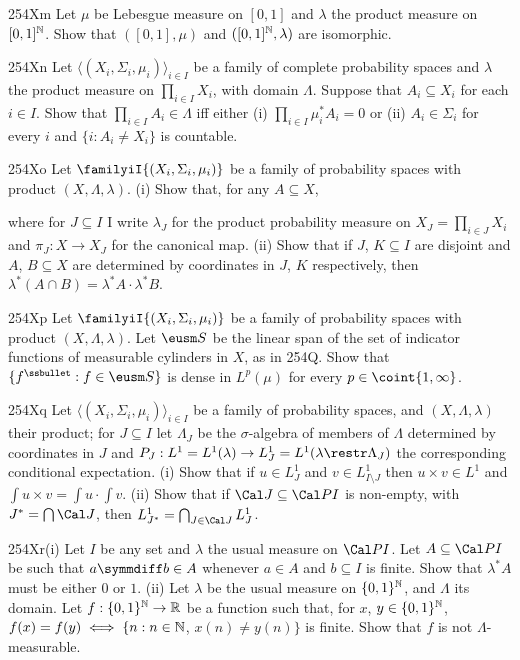 {\spheader 254Xm Let $\mu$ be Lebesgue measure on $[0,1]$ and
$\lambda$ the product measure on $[0,1]^{\Bbb N}$.   Show that
$([0,1],\mu)$ and $([0,1]^{\Bbb N},\lambda)$ are isomorphic.

\spheader 254Xn Let $\langle(X_i,\Sigma_i,\mu_i)\rangle_{i\in I}$
be a family of complete probability spaces and $\lambda$ the product
measure on $\prod_{i\in I}X_i$, with domain $\Lambda$.   Suppose that
$A_i\subseteq X_i$ for
each $i\in I$.   Show that $\prod_{i\in I}A_i\in\Lambda$ iff either (i)
$\prod_{i\in I}\mu_i^*A_i=0$ or (ii) $A_i\in\Sigma_i$ for
every $i$ and $\{i:A_i\ne X_i\}$ is countable.   

\spheader 254Xo Let $\familyiI{(X_i,\Sigma_i,\mu_i)}$ be a family of
probability spaces with product $(X,\Lambda,\lambda)$.   (i) Show that,
for any $A\subseteq X$,


\noindent where for $J\subseteq I$ I write $\lambda_J$ for the product
probability measure on $X_J=\prod_{i\in J}X_i$ and $\pi_J:X\to X_J$ for
the canonical map.   (ii) Show that if $J$, $K\subseteq I$ are disjoint
and $A$, $B\subseteq X$ are determined by coordinates in $J$, $K$
respectively, then $\lambda^*(A\cap B)=\lambda^*A\cdot\lambda^*B$.

\spheader 254Xp Let $\familyiI{(X_i,\Sigma_i,\mu_i)}$ be a family of
probability spaces with product $(X,\Lambda,\lambda)$.   Let $\eusm S$
be the linear span of the set of indicator functions of measurable
cylinders in $X$, as in 254Q.   Show that
$\{f^{\ssbullet}:f\in\eusm S\}$ is dense in $L^p(\mu)$ for every
$p\in\coint{1,\infty}$.

\spheader 254Xq Let $\langle(X_i,\Sigma_i,\mu_i)\rangle_{i\in I}$ be a
family of probability spaces, and $(X,\Lambda,\lambda)$ their product;
for $J\subseteq I$ let $\Lambda_J$ be the $\sigma$-algebra of members of
$\Lambda$ determined by coordinates in $J$ and
$P_J:L^1=L^1(\lambda)\to L^1_J=L^1(\lambda\restr\Lambda_J)$ the
corresponding conditional expectation.   (i) Show that if $u\in L^1_J$
and $v\in L^1_{I\setminus J}$ then $u\times v\in L^1$ and
$\int u\times v=\int u\cdot\int v$.
   (ii) Show that if $\Cal J\subseteq\Cal PI$ is
non-empty, with $J^*=\bigcap\Cal J$, then
$L^1_{J^*}=\bigcap_{J\in\Cal J}L^1_J$.

\spheader 254Xr(i) Let $I$ be any set and $\lambda$ the usual measure on
$\Cal PI$.   Let $A\subseteq\Cal PI$ be such that $a\symmdiff b\in A$
whenever $a\in A$ and $b\subseteq I$ is finite.   Show that $\lambda^*A$
must be either $0$ or $1$.
(ii) Let $\lambda$ be the usual measure on $\{0,1\}^{\Bbb N}$, and
$\Lambda$ its domain.   Let $f:\{0,1\}^{\Bbb N}\to\Bbb R$ be a function
such that, for $x$, $y\in\{0,1\}^{\Bbb N}$,
$f(x)=f(y)\iff\{n:n\in\Bbb N$, $x(n)\ne y(n)\}$ is finite.
Show that $f$ is not $\Lambda$-measurable.

}
